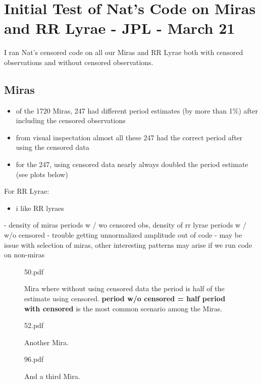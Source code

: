 \documentclass[10pt]{article}
\title{}
\date{}
\author{}
\begin{document}
\section*{Initial Test of Nat's Code on Miras and RR Lyrae - JPL - March 21}

I ran Nat's censored code on all our Miras and RR Lyrae both with censored observations and without censored observations.

\subsection{Miras}
\begin{itemize}
\item of the 1720 Miras, 247 had different period estimates (by more than 1\%) after including the censored observations
\item from visual inspectation almost all these 247 had the correct period after using the censored data
\item for the 247, using censored data nearly always doubled the period estimate (see plots below)
\end{itemize}



\noindent For RR Lyrae:
\begin{itemize}
\item i like RR lyraes
\end{itemize}

- density of miras periods w / wo censored obs, density of rr lyrae periods w / w/o censored 
- trouble getting unnormalized amplitude out of code
- may be issue with selection of miras, other interesting patterns may arise if we run code on non-miras




\begin{figure}[h]
  \begin{center}
    \begin{includegraphics}[height=4in,width=4in]{50.pdf}
      \caption{Mira where without using censored data the period is half of the estimate using censored. \textbf{period w/o censored = half period with censored} is the most common scenario among the Miras.}
    \end{includegraphics}
  \end{center}
\end{figure}


\begin{figure}[h]
  \begin{center}
    \begin{includegraphics}[height=4in,width=4in]{52.pdf}
      \caption{Another Mira.}
    \end{includegraphics}
  \end{center}
\end{figure}



\begin{figure}[h]
  \begin{center}
    \begin{includegraphics}[height=4in,width=4in]{96.pdf}
      \caption{And a third Mira.}
    \end{includegraphics}
  \end{center}
\end{figure}
\end{document}
